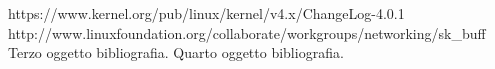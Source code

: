\begin{thebibliography}{90}   
\rhead[\fancyplain{}{\bfseries \leftmark}]{\fancyplain{}{\bfseries
\thepage}}
 https://www.kernel.org/pub/linux/kernel/v4.x/ChangeLog-4.0.1
 http://www.linuxfoundation.org/collaborate/workgroups/networking/sk\_buff
 Terzo oggetto bibliografia.
 Quarto oggetto bibliografia.
\end{thebibliography}
